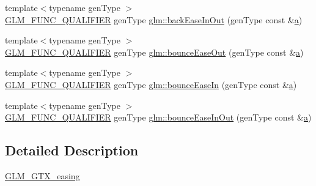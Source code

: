 \begin{DoxyCompactItemize}
\item 
{\footnotesize template$<$typename gen\+Type $>$ }\\\hyperlink{setup_8hpp_a33fdea6f91c5f834105f7415e2a64407}{G\+L\+M\+\_\+\+F\+U\+N\+C\+\_\+\+Q\+U\+A\+L\+I\+F\+I\+ER} gen\+Type \hyperlink{group__gtx__easing_gace6d24722a2f6722b56398206eb810bb}{glm\+::back\+Ease\+In\+Out} (gen\+Type const \&\hyperlink{_s_d_l__opengl__glext_8h_a3309789fc188587d666cda5ece79cf82}{a})
\item 
{\footnotesize template$<$typename gen\+Type $>$ }\\\hyperlink{setup_8hpp_a33fdea6f91c5f834105f7415e2a64407}{G\+L\+M\+\_\+\+F\+U\+N\+C\+\_\+\+Q\+U\+A\+L\+I\+F\+I\+ER} gen\+Type \hyperlink{group__gtx__easing_ga94007005ff0dcfa0749ebfa2aec540b2}{glm\+::bounce\+Ease\+Out} (gen\+Type const \&\hyperlink{_s_d_l__opengl__glext_8h_a3309789fc188587d666cda5ece79cf82}{a})
\item 
{\footnotesize template$<$typename gen\+Type $>$ }\\\hyperlink{setup_8hpp_a33fdea6f91c5f834105f7415e2a64407}{G\+L\+M\+\_\+\+F\+U\+N\+C\+\_\+\+Q\+U\+A\+L\+I\+F\+I\+ER} gen\+Type \hyperlink{group__gtx__easing_gaac30767f2e430b0c3fc859a4d59c7b5b}{glm\+::bounce\+Ease\+In} (gen\+Type const \&\hyperlink{_s_d_l__opengl__glext_8h_a3309789fc188587d666cda5ece79cf82}{a})
\item 
{\footnotesize template$<$typename gen\+Type $>$ }\\\hyperlink{setup_8hpp_a33fdea6f91c5f834105f7415e2a64407}{G\+L\+M\+\_\+\+F\+U\+N\+C\+\_\+\+Q\+U\+A\+L\+I\+F\+I\+ER} gen\+Type \hyperlink{group__gtx__easing_gadf9f38eff1e5f4c2fa5b629a25ae413e}{glm\+::bounce\+Ease\+In\+Out} (gen\+Type const \&\hyperlink{_s_d_l__opengl__glext_8h_a3309789fc188587d666cda5ece79cf82}{a})
\end{DoxyCompactItemize}


\subsection{Detailed Description}
\hyperlink{group__gtx__easing}{G\+L\+M\+\_\+\+G\+T\+X\+\_\+easing} 